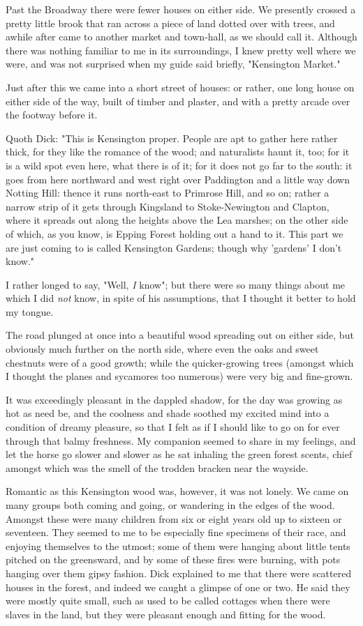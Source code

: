 Past the Broadway there were fewer houses on either side. We presently
crossed a pretty little brook that ran across a piece of land dotted
over with trees, and awhile after came to another market and town-hall,
as we should call it. Although there was nothing familiar to me in its
surroundings, I knew pretty well where we were, and was not surprised
when my guide said briefly, "Kensington Market."

Just after this we came into a short street of houses: or rather, one
long house on either side of the way, built of timber and plaster, and
with a pretty arcade over the footway before it.

Quoth Dick: "This is Kensington proper. People are apt to gather here
rather thick, for they like the romance of the wood; and naturalists
haunt it, too; for it is a wild spot even here, what there is of it; for
it does not go far to the south: it goes from here northward and west
right over Paddington and a little way down Notting Hill: thence it runs
north-east to Primrose Hill, and so on; rather a narrow strip of it gets
through Kingsland to Stoke-Newington and Clapton, where it spreads out
along the heights above the Lea marshes; on the other side of which, as
you know, is Epping Forest holding out a hand to it. This part we are
just coming to is called Kensington Gardens; though why 'gardens' I
don't know."

I rather longed to say, "Well, \emph{I} know"; but there were so many
things about me which I did \emph{not} know, in spite of his
assumptions, that I thought it better to hold my tongue.

The road plunged at once into a beautiful wood spreading out on either
side, but obviously much further on the north side, where even the oaks
and sweet chestnuts were of a good growth; while the quicker-growing
trees (amongst which I thought the planes and sycamores too numerous)
were very big and fine-grown.

It was exceedingly pleasant in the dappled shadow, for the day was
growing as hot as need be, and the coolness and shade soothed my excited
mind into a condition of dreamy pleasure, so that I felt as if I should
like to go on for ever through that balmy freshness. My companion seemed
to share in my feelings, and let the horse go slower and slower as he
sat inhaling the green forest scents, chief amongst which was the smell
of the trodden bracken near the wayside.

Romantic as this Kensington wood was, however, it was not lonely. We
came on many groups both coming and going, or wandering in the edges of
the wood. Amongst these were many children from six or eight years old
up to sixteen or seventeen. They seemed to me to be especially fine
specimens of their race, and enjoying themselves to the utmost; some of
them were hanging about little tents pitched on the greensward, and by
some of these fires were burning, with pots hanging over them gipsy
fashion. Dick explained to me that there were scattered houses in the
forest, and indeed we caught a glimpse of one or two. He said they were
mostly quite small, such as used to be called cottages when there were
slaves in the land, but they were pleasant enough and fitting for the
wood.

